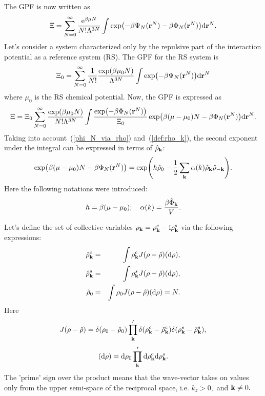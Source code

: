 The GPF is now written as
\begin{equation}
	\Xi = \sum_{N=0}^{\infty}\frac{{\rm e}^{\beta\mu N}}{N!\Lambda^{3N}} \int \exp(-\beta\Psi_N(\vb r^N) - \beta\Phi_N(\vb r^N)) {\rm d} {\vb r}^N.
\end{equation}
Let's consider a system characterized only by the repulsive part of the interaction potential as a reference system (RS). The GPF for the RS system is
\begin{equation}
	\label{def:GPF_0}
	\Xi_0 = \sum_{N=0}^{\infty} \frac{1}{N!} \frac{\exp(\beta\mu_0 N)}{\Lambda^{3N}} \int \exp(-\beta\Psi_N(\vb r^N)) {\rm d} {\vb r}^N
\end{equation}
where $\mu_0$ is the RS chemical potential.
Now, the GPF is expressed as
\begin{equation}
	\Xi = \Xi_0 \sum_{N=0}^{\infty} \frac{\exp(\beta\mu_0 N)}{N! \Lambda^{3N}} \int \frac{\exp(-\beta \Phi_N (\vb r^N))}{\Xi_0} \exp(\beta(\mu - \mu_0)N - \beta\Phi_N(\vb r^N)) {\rm d} {\vb r^N}.
\end{equation}
Taking into account~(\ref{phi_N_via_rho}) and~(\ref{def:rho_k}), the second exponent under the integral can be expressed in terms of $\hat{\rho}_{\vb k}$:
\begin{equation}
	\label{exp_attr}
	\exp(\beta(\mu - \mu_0)N - \beta\Phi_N(\vb r^N)) = \exp(h\hat{\rho}_0 - \frac{1}{2} \sum_{\vb k} \alpha(k) \hat{\rho}_{\vb k} \hat{\rho}_{-\vb k} ).
\end{equation}
Here the following notations were introduced:
\begin{equation}
	\label{def:h}
	h = \beta (\mu - \mu_0); \quad \alpha(k) = \frac{\beta\hat{\Phi}_{\vb k}}{V}.
\end{equation}

Let's define the set of collective variables $\rho_{\vb k} = \rho_{\vb k}^c - {\rm i} \rho_{\vb k}^s$ via the following expressions:
\begin{eqnarray}
	\label{def:col_var}
	\hat{\rho}_{\vb k}^c &=& \int\rho_{\vb k}^c J(\rho - \hat{\rho}) ({\rm d}\rho),
	\nonumber\\
	\hat{\rho}_{\vb k}^s &=& \int\rho_{\vb k}^s J(\rho - \hat{\rho}) ({\rm d}\rho),
	\nonumber\\
	\hat{\rho}_0 &=&  \int\rho_0 J(\rho - \hat{\rho}) ({\rm d}\rho) = N.
\end{eqnarray}
Here
\begin{equation}
	J(\rho - \hat{\rho}) = \delta(\rho_0 - \hat{\rho}_0) \prod_{\vb k}' \delta(\rho_{\vb k}^c - \hat{\rho}_{\vb k}^c) \delta(\rho_{\vb k}^s - \hat{\rho}_{\vb k}^s),
\end{equation}
\begin{equation}
	({\rm d} \rho) = {\rm d}\rho_0 \prod_{\vb k}' {\rm d}\rho_{\vb k}^c {\rm d}\rho_{\vb k}^s.
\end{equation}
The 'prime' sign over the product means that the wave-vector takes on values only from the upper semi-space of the reciprocal space, i.e. $k_z>0,$ and $\vb k \neq 0.$

